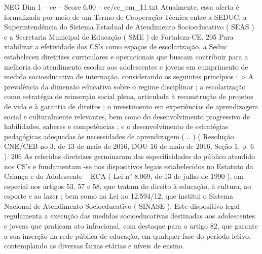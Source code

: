 \begin{textsample}{NEG Dim 1 – ce – Score 6.00 – ce/ce\_em\_11.txt}
Atualmente, essa oferta é formalizada por meio de um Termo de Cooperação Técnica entre a SEDUC, a Superintendência do Sistema Estadual de Atendimento Socioeducativo ( SEAS ) e a Secretaria Municipal de Educação ( SME ) de Fortaleza-CE. 205 Para viabilizar a efetividade dos CS’s como espaços de escolarização, a Seduc estabeleceu diretrizes curriculares e operacionais que buscam contribuir para a melhoria do atendimento escolar aos adolescentes e jovens em cumprimento de medida socioeducativa de internação, considerando os seguintes princípios : > A prevalência da dimensão educativa sobre o regime disciplinar ; a escolarização como estratégia de reinserção social plena, articulada à reconstrução de projetos de vida e à garantia de direitos ; o investimento em experiências de aprendizagem social e culturalmente relevantes, bem como do desenvolvimento progressivo de habilidades, saberes e competências ; e o desenvolvimento de estratégias pedagógicas adequadas às necessidades de aprendizagem (... ) ( Resolução CNE/CEB no 3, de 13 de maio de 2016, DOU 16 de maio de 2016, Seção 1, p. 6 ). 206 As referidas diretrizes germinaram das especificidades do público atendido nos CS’s e fundamentam -se nos dispositivos legais estabelecidos no Estatuto da Criança e do Adolescente – ECA ( Lei n{\EmojiFont °} 8.069, de 13 de julho de 1990 ), em especial nos artigos 53, 57 e 58, que tratam do direito à educação, à cultura, ao esporte e ao lazer ; bem como na Lei no 12.594/12, que institui o Sistema Nacional de Atendimento Socioeducativo ( SINASE ).
Este dispositivo legal regulamenta a execução das medidas socioeducativas destinadas aos adolescentes e jovens que praticam ato infracional, com destaque para o artigo 82, que garante a sua inserção na rede pública de educação, em qualquer fase do período letivo, contemplando as diversas faixas etárias e níveis de ensino.

\end{textsample}
